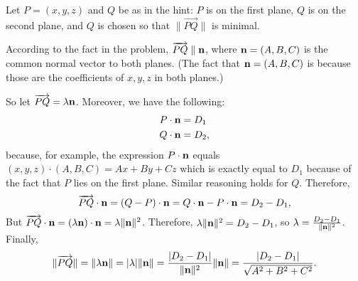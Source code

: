 \documentclass[11pt,oneside]{amsart}
\theoremstyle{definition}
\begin{document}
\begin{solution}
  Let $P=(x,y,z)$ and $Q$ be as in the hint: $P$ is on the first plane, $Q$ is on the second plane, and $Q$ is chosen so that $\|\overrightarrow{PQ}\|$ is minimal.

  According to the fact in the problem, $\overrightarrow{PQ}\parallel\mathbf n$, where $\mathbf n=(A,B,C)$ is the common normal vector to both planes. (The fact that $\mathbf n=(A,B,C)$ is because those are the coefficients of $x,y,z$ in both planes.)

  So let $\overrightarrow{PQ}=\lambda\mathbf n$. Moreover, we have the following:
  \begin{align*}
    P\cdot\mathbf n&= D_1\\
    Q\cdot\mathbf n &= D_2,
  \end{align*}
  because, for example, the expression $P\cdot\mathbf n$ equals $(x,y,z)\cdot(A,B,C)=Ax+By+Cz$ which is exactly equal to $D_1$ because of the fact that $P$ lies on the first plane. Similar reasoning holds for $Q$. Therefore,
  \[\overrightarrow{PQ}\cdot\mathbf n=(Q-P)\cdot \mathbf n=Q\cdot \mathbf n-P\cdot \mathbf n=D_2-D_1,\]
  But $\overrightarrow{PQ}\cdot\mathbf n=(\lambda\mathbf n)\cdot\mathbf n=\lambda\|\mathbf n\|^2$. Therefore, $\lambda\|\mathbf n\|^2=D_2-D_1$, so $\lambda=\frac{D_2-D_1}{\|\mathbf n\|^2}$. Finally,
  \[\|\overrightarrow{PQ}\|=\|\lambda\mathbf n\|=|\lambda|\|\mathbf n\|=\frac{|D_2-D_1|}{\|\mathbf n\|^2}\|\mathbf n\|=\frac{|D_2-D_1|}{\sqrt{A^2+B^2+C^2}}.\]
\end{solution}

  
\end{document}
